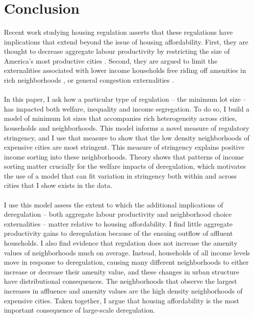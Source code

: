 \documentclass[12pt]{article}
\begin{document}
\section{Conclusion}
\paragraph*{}
	Recent work studying housing regulation asserts that these regulations have implications that extend beyond the issue of housing affordability. First, they are thought to decrease aggregate labour productivity by restricting the size of America's most productive cities \citep{glaesergyourko2018, hseihmoretti, durantonpugaurbgrowth, parkho}. Second, they are argued to limit the externalities associated with lower income households free riding off amenities in rich neighborhoods \citep{hamilton1976, ineffTiebout, brueckner2021}, or general congestion externalities \citep{parkho, glaesergyourko2018}. 
\paragraph*{}
	In this paper, I ask how a particular type of regulation -- the minimum lot size -- has impacted both welfare, inequality and income segregation. To do so, I build a model of minimum lot sizes that accompanies rich heterogeneity across cities, households and neighborhoods. This model informs a novel measure of regulatory stringency, and I use that measure to show that the low density neighborhoods of expensive cities are most stringent. This measure of stringency explains positive income sorting into these neighborhoods. Theory shows that patterns of income sorting matter crucially for the welfare impacts of deregulation, which motivates the use of a model that can fit variation in stringency both within and across cities that I show exists in the data.
	
	\paragraph*{}
	I use this model assess the extent to which the additional implications of deregulation -- both aggregate labour productivity and neighborhood choice externalities -- matter relative to housing affordability. I find little aggregate productivity gains to deregulation because of the ensuing outflow of affluent households. I also find evidence that regulation does not increase the amenity values of neighborhoods much on average. Instead, households of all income levels move in response to deregulation, causing many different neighborhoods to either increase or decrease their amenity value, and these changes in urban structure have distributional consequences. The neighborhoods that observe the largest increases in affluence and amenity values are the high density neighborhoods of expensive cities. Taken together, I argue that housing affordability is the most important consequence of large-scale deregulation. 
	
\end{document}
